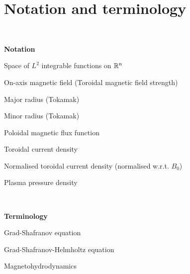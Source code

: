 

\chapter{Notation and terminology}\label{notation}

\renewcommand{\thefootnote}{\fnsymbol{footnote}}


\

\noindent\textbf{Notation}


\newcommand{\nttn}[2]{\item[{\ \makebox[3.18cm][l]{#1}}]{#2}}
\begin{list}{}{ \setlength{\leftmargin}{3.4cm}
                \setlength{\labelwidth}{3.4cm}}

\nttn{$L^2(\R^n)$}{Space of $L^2$ integrable functions on $\mathbb{R}^n$}

\nttn{$B_0$}{On-axis magnetic field (Toroidal magnetic field strength)}
\nttn{$R_0$}{Major radius (Tokamak)}
\nttn{$a$}{Minor radius (Tokamak)}
\nttn{$\psi$}{Poloidal magnetic flux function}
\nttn{$j_{\phi}$}{Toroidal current density}
\nttn{$J_{\phi}$}{Normalised toroidal current density (normalised w.r.t. $B_0$)}
\nttn{$p$}{Plasma pressure density}

\end{list}

\

\noindent\textbf{Terminology}


\newcommand{\term}[2]{\item[{\ \makebox[4.58cm][l]{#1}}]{#2}}
\begin{list}{}{ \setlength{\leftmargin}{4.8cm}
                \setlength{\labelwidth}{4.8cm}}


\term{GS / GSE}{Grad-Shafranov equation}
\term{GSH}{Grad-Shafranov-Helmholtz equation}
\term{MHD}{Magnetohydrodynamics}


\end{list}
